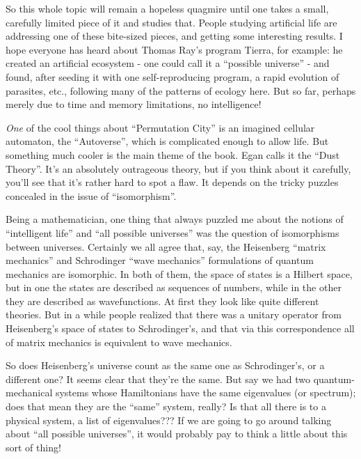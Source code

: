 \documentclass{article}
\begin{document}
So this whole topic will remain a hopeless quagmire until one takes a
small, carefully limited piece of it and studies that. People studying
artificial life are addressing one of these bite-sized pieces, and
getting some interesting results. I hope everyone has heard about Thomas
Ray's program Tierra, for example: he created an artificial ecosystem -
one could call it a ``possible universe'' - and found, after seeding it
with one self-reproducing program, a rapid evolution of parasites, etc.,
following many of the patterns of ecology here. But so far, perhaps
merely due to time and memory limitations, no intelligence!

\emph{One} of the cool things about ``Permutation City'' is an imagined
cellular automaton, the ``Autoverse'', which is complicated enough to
allow life. But something much cooler is the main theme of the book.
Egan calls it the ``Dust Theory''. It's an absolutely outrageous theory,
but if you think about it carefully, you'll see that it's rather hard to
spot a flaw. It depends on the tricky puzzles concealed in the issue of
``isomorphism''.

Being a mathematician, one thing that always puzzled me about the
notions of ``intelligent life'' and ``all possible universes'' was the
question of isomorphisms between universes. Certainly we all agree that,
say, the Heisenberg ``matrix mechanics'' and Schrodinger ``wave
mechanics'' formulations of quantum mechanics are isomorphic. In both of
them, the space of states is a Hilbert space, but in one the states are
described as sequences of numbers, while in the other they are described
as wavefunctions. At first they look like quite different theories. But
in a while people realized that there was a unitary operator from
Heisenberg's space of states to Schrodinger's, and that via this
correspondence all of matrix mechanics is equivalent to wave mechanics.

So does Heisenberg's universe count as the same one as Schrodinger's, or
a different one? It seems clear that they're the same. But say we had
two quantum-mechanical systems whose Hamiltonians have the same
eigenvalues (or spectrum); does that mean they are the ``same'' system,
really? Is that all there is to a physical system, a list of
eigenvalues??? If we are going to go around talking about ``all possible
universes'', it would probably pay to think a little about this sort of
thing!
\end{document}
